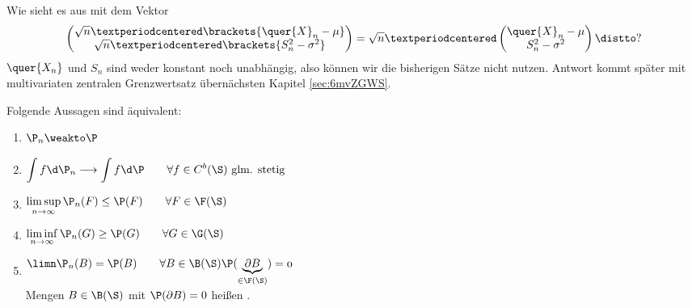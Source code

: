 Wie sieht es aus mit dem Vektor
\begin{align*}
	\begin{pmatrix}
		\sqrt{n}·\brackets{\quer{X}_n-\mu}\\
		\sqrt{n}·\brackets{S_n^2-\sigma^2}
	\end{pmatrix}
	=\sqrt{n}·\begin{pmatrix}
		\quer{X}_n-\mu\\
		S_n^2-\sigma^2
	\end{pmatrix}
	\distto ?
\end{align*}
$\quer{X_n}$ und $S_n$ sind weder konstant noch unabhängig, also
können wir die bisherigen Sätze nicht nutzen.
Antwort kommt später mit multivariaten zentralen Grenzwertsatz
übernächsten Kapitel \ref{sec:6mvZGWS}.

\begin{satz}\label{satz4.2}
	Folgende Aussagen sind äquivalent:
	\begin{enumerate}[label=(\arabic*)]
		\item \label{it:4.2weakConv} $\begin{aligned}
			\P_n\weakto  \P
		\end{aligned}$
	\item \label{it:4.2f} $\begin{aligned}
			\int f\d \P_n\overset{}{\longrightarrow}\int f\d \P\qquad\forall f\in C^b(\S)\text{ glm. stetig}
		\end{aligned}$
	\item \label{it:4.2ClosedSets} $\begin{aligned}
			\limsup_{n\to\infty} \P_n(F)\le \P(F)\qquad\forall F\in\F(\S)
		\end{aligned}$
	\item \label{it:4.2OpenSets} $\begin{aligned}
			\liminf_{n\to\infty} \P_n(G)\ge \P(G)\qquad\forall G\in\G(\S)
		\end{aligned}$
	\item \label{it:4.2BorelSets} $\begin{aligned}
			\limn \P_n(B)=\P(B)\qquad\forall B\in\B(\S)\mit \P(\underbrace{\partial B}_{\in\F(\S)})=0
		\end{aligned}$\\
		Mengen $B\in\B(\S)$ mit $\P(\partial B)=0$ heißen .
	\end{enumerate}
\end{satz}

